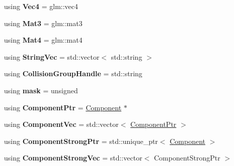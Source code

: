 \begin{DoxyCompactItemize}
\item 
\hypertarget{namespaceDCEngine_a389870cef94af54de4029458caa4912e}{using {\bfseries Vec4} = glm\-::vec4}\label{namespaceDCEngine_a389870cef94af54de4029458caa4912e}

\item 
\hypertarget{namespaceDCEngine_a0a72bc192e4169d86998f6a22aaf8ed3}{using {\bfseries Mat3} = glm\-::mat3}\label{namespaceDCEngine_a0a72bc192e4169d86998f6a22aaf8ed3}

\item 
\hypertarget{namespaceDCEngine_abd3cf275160d58a148e29d8904293dbd}{using {\bfseries Mat4} = glm\-::mat4}\label{namespaceDCEngine_abd3cf275160d58a148e29d8904293dbd}

\item 
\hypertarget{namespaceDCEngine_af60a29cbc852ec7dd8bd3525d82bade6}{using {\bfseries String\-Vec} = std\-::vector$<$ std\-::string $>$}\label{namespaceDCEngine_af60a29cbc852ec7dd8bd3525d82bade6}

\item 
\hypertarget{namespaceDCEngine_a19390f41f7f1e455e196c07cfa9aa5c8}{using {\bfseries Collision\-Group\-Handle} = std\-::string}\label{namespaceDCEngine_a19390f41f7f1e455e196c07cfa9aa5c8}

\item 
\hypertarget{namespaceDCEngine_a368adc05af87f06e0df93cc805cda622}{using {\bfseries mask} = unsigned}\label{namespaceDCEngine_a368adc05af87f06e0df93cc805cda622}

\item 
\hypertarget{namespaceDCEngine_aab54ca02077851a2492239d81b873a54}{using {\bfseries Component\-Ptr} = \hyperlink{classDCEngine_1_1Component}{Component} $\ast$}\label{namespaceDCEngine_aab54ca02077851a2492239d81b873a54}

\item 
\hypertarget{namespaceDCEngine_a2e7f474eec165d1a7552f0b4473ee4cd}{using {\bfseries Component\-Vec} = std\-::vector$<$ \hyperlink{classDCEngine_1_1Component}{Component\-Ptr} $>$}\label{namespaceDCEngine_a2e7f474eec165d1a7552f0b4473ee4cd}

\item 
\hypertarget{namespaceDCEngine_a2fc7506f691f5c7a2d7f0fcce904100f}{using {\bfseries Component\-Strong\-Ptr} = std\-::unique\-\_\-ptr$<$ \hyperlink{classDCEngine_1_1Component}{Component} $>$}\label{namespaceDCEngine_a2fc7506f691f5c7a2d7f0fcce904100f}

\item 
\hypertarget{namespaceDCEngine_ad54b610d8788964be979d4f22fa88838}{using {\bfseries Component\-Strong\-Vec} = std\-::vector$<$ Component\-Strong\-Ptr $>$}\label{namespaceDCEngine_ad54b610d8788964be979d4f22fa88838}


\end{DoxyCompactItemize}
